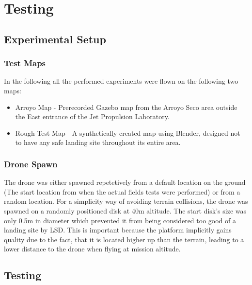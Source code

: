 \chapter{Testing}
\label{sec:testing}

\section{Experimental Setup}
\subsection{Test Maps}
In the following all the performed experiments were flown on the following two maps:
\begin{itemize}
    \item Arroyo Map - Prerecorded Gazebo map from the Arroyo Seco area outside the East entrance of the Jet Propulsion Laboratory.
    \item Rough Test Map - A synthetically created map using Blender, designed not to have any safe landing site throughout its entire area. 
\end{itemize}
\subsection{Drone Spawn}
The drone was either spawned repetetively from a default location on the ground (The start location from when the actual fields tests were performed) or from a random location. For a simplicity way of  avoiding terrain collisions, the drone was spawned on a randomly positioned disk at 40m altitude. The start disk's size was only 0.5m in diameter which prevented it from being considered too good of a landing site by LSD. This is important because the platform implicitly gains quality due to the fact, that it is located higher up than the terrain, leading to a lower distance to the drone when flying at mission altitude.


\section{Testing}



